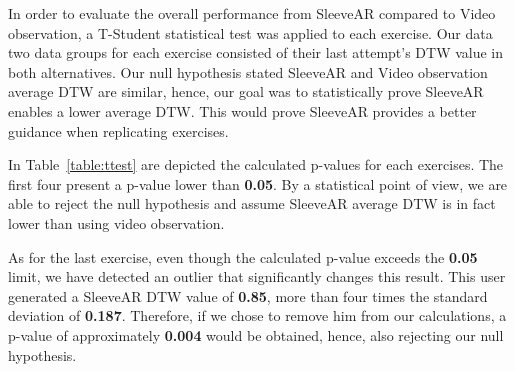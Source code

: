 In order to evaluate the overall performance from SleeveAR compared to Video observation, a T-Student statistical test was applied to each exercise. 
Our data two data groups for each exercise consisted of their last attempt's DTW value in both alternatives.
Our null hypothesis stated SleeveAR and Video observation average DTW are similar, hence, our goal was to statistically prove SleeveAR enables a lower average DTW. 
This would prove SleeveAR provides a better guidance when replicating exercises.

In Table~\ref{table:ttest} are depicted the calculated p-values for each exercises.
The first four present a p-value lower than \textbf{0.05}. 
By a statistical point of view, we are able to reject the null hypothesis and assume SleeveAR average DTW is in fact lower than using video observation.

As for the last exercise, even though the calculated p-value exceeds the \textbf{0.05} limit, we have detected an outlier that significantly changes this result.
This user generated a SleeveAR DTW value of \textbf{0.85}, more than four times the standard deviation of \textbf{0.187}. 
Therefore, if we chose to remove him from our calculations, a p-value of approximately \textbf{0.004} would be obtained, hence, also rejecting our null hypothesis.


\begin{table}[!t]
\centering
{}
\caption{T-Student Test for all exercises. SleeveAR(S), Video(V)}
\label{table:ttest}
\end{table}


